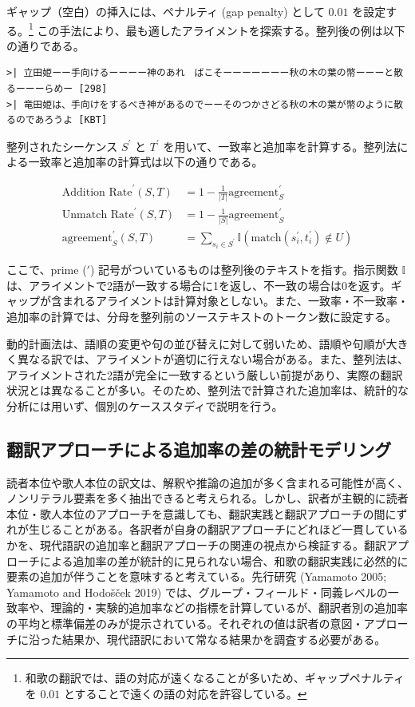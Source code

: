 \documentclass[
  letterpaper,
  DIV=11,
  numbers=noendperiod]{scrartcl}
\begin{document}
ギャップ（空白）の挿入には、ペナルティ (gap penalty) として \(0.01\)
を設定する。\footnote{和歌の翻訳では、語の対応が遠くなることが多いため、ギャップペナルティを
  \(0.01\) とすることで遠くの語の対応を許容している。}
この手法により、最も適したアライメントを探索する。整列後の例は以下の通りである。

\begin{verbatim}
>| 立田姫ーー手向けるーーーー神のあれ　ばこそーーーーーーー秋の木の葉の幣ーーーと散るーーーらめー [298]
>| 竜田姫は、手向けをするべき神があるのでーーそのつかさどる秋の木の葉が幣のように散るのであろうよ [KBT]
\end{verbatim}

整列されたシーケンス \(S^{\prime}\) と \(T^{\prime}\)
を用いて、一致率と追加率を計算する。整列法による一致率と追加率の計算式は以下の通りである。

\[
\begin{align}
\text{Addition Rate}^{\prime}(S,T) &= 1-\frac{1}{|T|}\text{agreement}^{\prime}_{S}\\
\text{Unmatch Rate}^{\prime}(S,T) &= 1-\frac{1}{|S|}\text{agreement}^{\prime}_{S}\\
\text{agreement}^{\prime}_{S}(S,T) &= \sum_{s_i \in S^{\prime}} \mathbb{I} \left(\text{match}(s_i^{\prime}, t_i^{\prime}) \notin U \right)
\end{align}
\]

ここで、prime (\(\prime\))
記号がついているものは整列後のテキストを指す。指示関数 \(\mathbb{I}\)
は、アライメントで2語が一致する場合に1を返し、不一致の場合は0を返す。ギャップが含まれるアライメントは計算対象としない。また、一致率・不一致率・追加率の計算では、分母を整列前のソーステキストのトークン数に設定する。

動的計画法は、語順の変更や句の並び替えに対して弱いため、語順や句順が大きく異なる訳では、アライメントが適切に行えない場合がある。また、整列法は、アライメントされた2語が完全に一致するという厳しい前提があり、実際の翻訳状況とは異なることが多い。そのため、整列法で計算された追加率は、統計的な分析には用いず、個別のケーススタディで説明を行う。

\subsection{翻訳アプローチによる追加率の差の統計モデリング}\label{ux7ffbux8a33ux30a2ux30d7ux30edux30fcux30c1ux306bux3088ux308bux8ffdux52a0ux7387ux306eux5deeux306eux7d71ux8a08ux30e2ux30c7ux30eaux30f3ux30b0}

読者本位や歌人本位の訳文は、解釈や推論の追加が多く含まれる可能性が高く、ノンリテラル要素を多く抽出できると考えられる。しかし、訳者が主観的に読者本位・歌人本位のアプローチを意識しても、翻訳実践と翻訳アプローチの間にずれが生じることがある。各訳者が自身の翻訳アプローチにどれほど一貫しているかを、現代語訳の追加率と翻訳アプローチの関連の視点から検証する。翻訳アプローチによる追加率の差が統計的に見られない場合、和歌の翻訳実践に必然的に要素の追加が伴うことを意味すると考えている。先行研究
(Yamamoto 2005; Yamamoto and Hodošček 2019)
では、グループ・フィールド・同義レベルの一致率や、理論的・実験的追加率などの指標を計算しているが、翻訳者別の追加率の平均と標準偏差のみが提示されている。それぞれの値は訳者の意図・アプローチに沿った結果か、現代語訳において常なる結果かを調査する必要がある。
\end{document}
